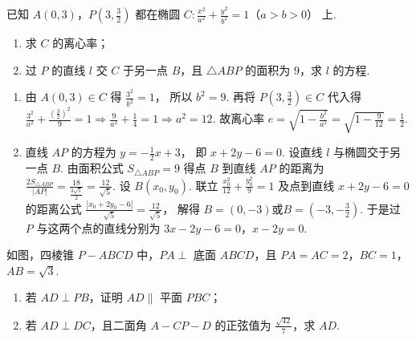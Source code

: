 \begin{problem}
已知 \(A(0,3)\)，\(P\left(3,\frac32\right)\) 都在椭圆
\(C:\frac{x^2}{a^2}+\frac{y^2}{b^2}=1\)（\(a>b>0\)）
上.
\begin{enumerate}
\item 求 \(C\) 的离心率；
\item 过 \(P\) 的直线 \(l\) 交 \(C\) 于另一点 \(B\)，且 \(\triangle ABP\) 的面积为 \(9\)，求 \(l\) 的方程.
\end{enumerate}
\end{problem}

\begin{solution}
\begin{enumerate}
\item 由 \(A(0,3)\in C\) 得
\(\frac{3^2}{b^2}=1\)，
所以
\(b^2=9\).
再将 \(P\left(3,\frac32\right)\in C\) 代入得
\(\frac{3^2}{a^2}+\frac{(\frac{3}{2})^2}{9}=1 \Rightarrow \frac{9}{a^2}+\frac14=1 \Rightarrow a^2=12\).
故离心率
\(e=\sqrt{1-\frac{b^2}{a^2}}=\sqrt{1-\frac{9}{12}}=\frac12\).

\item 直线 \(AP\) 的方程为
\(y=-\frac12x+3\)，
即
\(x+2y-6=0\).
设直线 \(l\) 与椭圆交于另一点 \(B\). 由面积公式
\(S_{\triangle ABP}=9\)
得点 \(B\) 到直线 \(AP\) 的距离为
\(\frac{2S_{\triangle ABP}}{|AP|}=\frac{18}{\frac{3\sqrt5}{2}}=\frac{12}{\sqrt5}\).
设 \(B(x_0,y_0)\). 联立
\(\frac{x_0^2}{12}+\frac{y_0^2}{9}=1\)
及点到直线 \(x+2y-6=0\) 的距离公式
\(\frac{|x_0+2y_0-6|}{\sqrt5}=\frac{12}{\sqrt5}\)，
解得
\(B=(0,-3)\)或\(B=\left(-3,-\frac32\right)\).
于是过 \(P\) 与这两个点的直线分别为
\(3x-2y-6=0\)，\(x-2y=0\).
\end{enumerate}
\end{solution}

\begin{problem}
如图，四棱锥 \(P-ABCD\) 中，\(PA\perp\) 底面 \(ABCD\)，且 \(PA=AC=2\)，\(BC=1\)，\(AB=\sqrt3\).

\begin{enumerate}
\item 若 \(AD\perp PB\)，证明 \(AD\parallel\) 平面 \(PBC\)；
\item 若 \(AD\perp DC\)，且二面角 \(A-CP-D\) 的正弦值为 \(\frac{\sqrt{42}}{7}\)，求 \(AD\).
\end{enumerate}

\end{problem}

